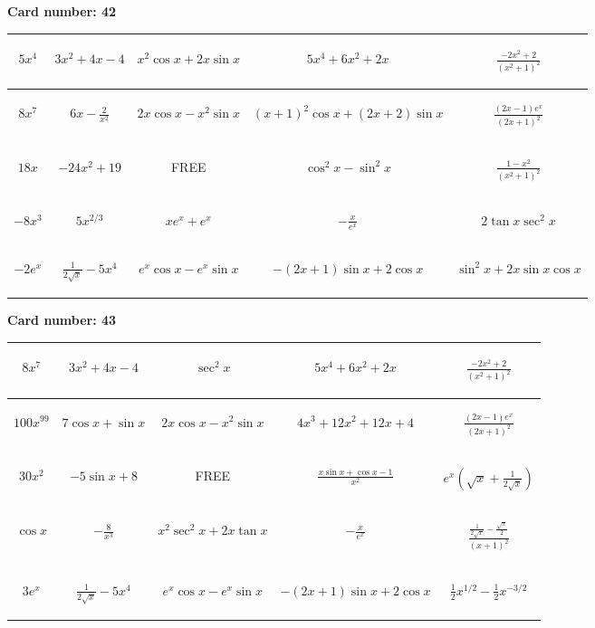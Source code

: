 \documentclass{article}
\newcommand{\entry}[1]{\begin{minipage}[t][2.75cm][t]{4cm} \vspace{1cm} \begin{center}#1\end{center} \end{minipage}}
\newcommand{\freespace}{\entry{FREE}}
\newcommand{\cardnumber}[1]{\noindent \textbf{Card number: #1} \bigskip}
\begin{document}
\pagebreak

\cardnumber{42}
\begin{center}
\begin{tabular}{|*{5}{c|}}
    \hline
    \entry{$5x^4$} & \entry{$3x^2 + 4x - 4$} & \entry{$x^2 \cos x + 2x \sin x$} & \entry{$5x^4 + 6x^2 + 2x$} & \entry{$\frac{-2x^2 + 2}{(x^2 + 1)^2}$} \\ \hline
    \entry{$8x^7$} & \entry{$6x - \frac{2}{x^2}$} & \entry{$2x \cos x - x^2 \sin x$} & \entry{$(x + 1)^2 \cos x + (2x + 2) \sin x$} & \entry{$\frac{(2x - 1) e^x}{(2x + 1)^2}$} \\ \hline
    \entry{$18x$} & \entry{$-24x^2 + 19$} & \freespace & \entry{$\cos^2 x - \sin^2 x$} & \entry{$\frac{1 - x^2}{(x^2 + 1)^2}$} \\ \hline
    \entry{$-8x^3$} & \entry{$5x^{2/3}$} & \entry{$x e^x + e^x$} & \entry{$-\frac{x}{e^x}$} & \entry{$2 \tan x \sec^2 x$} \\ \hline
    \entry{$-2e^x$} & \entry{$\frac{1}{2\sqrt{x}} - 5x^4$} & \entry{$e^x \cos x - e^x \sin x$} & \entry{$-(2x + 1) \sin x + 2 \cos x$} & \entry{$\sin^2 x + 2x \sin x \cos x$} \\ \hline
\end{tabular}
\end{center}

\pagebreak

\cardnumber{43}
\begin{center}
\begin{tabular}{|*{5}{c|}}
    \hline
    \entry{$8x^7$} & \entry{$3x^2 + 4x - 4$} & \entry{$\sec^2 x$} & \entry{$5x^4 + 6x^2 + 2x$} & \entry{$\frac{-2x^2 + 2}{(x^2 + 1)^2}$} \\ \hline
    \entry{$100x^{99}$} & \entry{$7 \cos x + \sin x$} & \entry{$2x \cos x - x^2 \sin x$} & \entry{$4x^3 + 12x^2 + 12x + 4$} & \entry{$\frac{(2x - 1) e^x}{(2x + 1)^2}$} \\ \hline
    \entry{$30x^2$} & \entry{$-5 \sin x + 8$} & \freespace & \entry{$\frac{x \sin x + \cos x - 1}{x^2}$} & \entry{$e^x \left(\sqrt{x} + \frac{1}{2\sqrt{x}}\right)$} \\ \hline
    \entry{$\cos x$} & \entry{$-\frac{8}{x^3}$} & \entry{$x^2 \sec^2 x + 2x \tan x$} & \entry{$-\frac{x}{e^x}$} & \entry{$\frac{\frac{1}{2 \sqrt{x}} - \frac{\sqrt{x}}{2}}{(x + 1)^2}$} \\ \hline
    \entry{$3e^x$} & \entry{$\frac{1}{2\sqrt{x}} - 5x^4$} & \entry{$e^x \cos x - e^x \sin x$} & \entry{$-(2x + 1) \sin x + 2 \cos x$} & \entry{$\frac{1}{2} x^{1/2} - \frac{1}{2} x^{-3/2}$} \\ \hline
\end{tabular}
\end{center}
\end{document}
